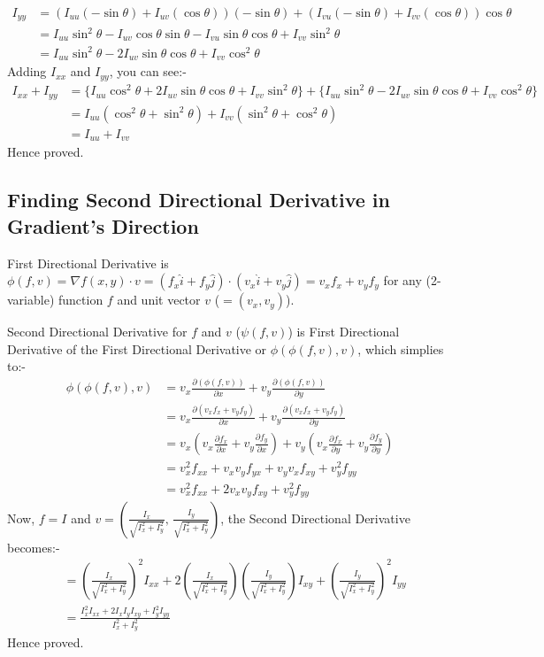 \documentclass[12pt]{article}
\begin{document}
\begin{align*}
    I_{yy} &= (I_{uu} (- \sin \theta) + I_{uv} (\cos \theta)) (- \sin \theta) + (I_{vu} (- \sin \theta) + I_{vv} (\cos \theta)) \cos \theta \\
    &= I_{uu} \sin^2 \theta  - I_{uv} \cos \theta \sin \theta - I_{vu} \sin \theta \cos \theta + I_{vv} \sin^2 \theta \\
    &= I_{uu} \sin^2 \theta - 2 I_{uv} \sin \theta \cos \theta + I_{vv} \cos^2 \theta
\end{align*}
Adding $I_{xx}$ and $I_{yy}$, you can see:-
\begin{align*}
    I_{xx} + I_{yy} &= \{I_{uu} \cos^2 \theta + 2 I_{uv} \sin \theta \cos \theta + I_{vv} \sin^2 \theta\} + \{I_{uu} \sin^2 \theta - 2 I_{uv} \sin \theta \cos \theta + I_{vv} \cos^2 \theta\} \\
    &= I_{uu} (\cos^2 \theta + \sin^2 \theta) + I_{vv} (\sin^2 \theta + \cos^2 \theta) \\
    &= I_{uu} + I_{vv}
\end{align*}
Hence proved.

\subsection*{Finding Second Directional Derivative in Gradient's Direction}
First Directional Derivative is $\phi (f, v) = \nabla f(x, y) \cdot v = (f_x \hat{i} + f_y \hat{j}) \cdot (v_x \hat{i} + v_y \hat{j}) = v_x f_x + v_y f_y$ for any (2-variable) function $f$ and unit vector $v$ ($= (v_x, v_y)$).

Second Directional Derivative for $f$ and $v$ ($\psi (f, v)$) is First Directional Derivative of the First Directional Derivative or $\phi (\phi (f, v), v)$, which simplies to:-
\begin{align*}
    \phi (\phi (f, v), v) &= v_x \frac{\partial (\phi (f, v))}{\partial x} + v_y \frac{\partial (\phi (f, v))}{\partial y} \\
    &= v_x \frac{\partial (v_x f_x + v_y f_y)}{\partial x} + v_y \frac{\partial (v_x f_x + v_y f_y)}{\partial y} \\
    &= v_x \left(v_x \frac{\partial f_x}{\partial x} + v_y \frac{\partial f_y}{\partial x}\right) + v_y \left(v_x \frac{\partial f_x}{\partial y} + v_y \frac{\partial f_y}{\partial y}\right) \\
    &= v_x^2 f_{xx} + v_x v_y f_{yx} + v_y v_x f_{xy} + v_y^2 f_{yy} \\
    &= v_x^2 f_{xx} + 2 v_x v_y f_{xy} + v_y^2 f_{yy}
\end{align*}
Now, $f = I$ and $v = \left(\frac{I_x}{\sqrt{I_x^2 + I_y^2}}, \, \frac{I_y}{\sqrt{I_x^2 + I_y^2}}\right)$, the Second Directional Derivative becomes:-
\begin{align*}
    &= \left(\frac{I_x}{\sqrt{I_x^2 + I_y^2}}\right)^2 I_{xx} + 2 \left(\frac{I_x}{\sqrt{I_x^2 + I_y^2}}\right) \left(\frac{I_y}{\sqrt{I_x^2 + I_y^2}}\right) I_{xy} +  \left(\frac{I_y}{\sqrt{I_x^2 + I_y^2}}\right)^2 I_{yy} \\
    &= \frac{I_x^2 I_{xx} + 2 I_x I_y I_{xy} + I_y^2 I_{yy}}{I_x^2 + I_y^2}
\end{align*}
Hence proved.
\end{document}

